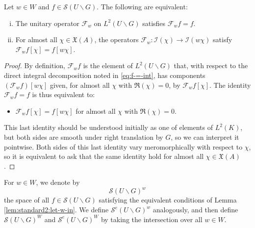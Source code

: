 \begin{lemma}\label{lem:standard2:let-w-in}
  Let $w \in W$ and $f \in \mathcal{S}(U \backslash G)$.  The following are equivalent:
  \begin{enumerate}[(i)]
  \item \label{itm:standard2:F-w-unitary} The unitary operator $\mathcal{F}_w$ on $L^2(U \backslash G)$ satisfies $\mathcal{F}_w f = f$.
  \item \label{itm:standard2:F-w-mellin} For almost all $\chi \in \mathfrak{X}(A)$, the operators $\mathcal{F}_w : \mathcal{I}(\chi) \rightarrow \mathcal{I}(w \chi)$ satisfy $\mathcal{F}_w f[\chi] = f [ w \chi]$.
  \end{enumerate}
\end{lemma}
\begin{proof}
  By definition, $\mathcal{F}_w f$ is the element of $L^2(U \backslash G)$ that, with respect to the direct integral decomposition noted in \eqref{eq:f-=-int}, has components $(\mathcal{F}_w f)[w \chi]$ given, for almost all $\chi$ with $\Re(\chi) = 0$, by $\mathcal{F}_w f[\chi]$.  The identity $\mathcal{F}_w f = f$ is thus equivalent to:
  \begin{itemize}
  \item $\mathcal{F}_w f[\chi] = f[w \chi]$ for almost all $\chi$ with $\Re(\chi) = 0$.
  \end{itemize}
  This last identity should be understood initially as one of elements of $L^2(K)$, but both sides are smooth under right translation by $G$, so we can interpret it pointwise.  Both sides of this last identity vary meromorphically with respect to $\chi$, so it is equivalent to ask that the same identity hold for almost all $\chi \in \mathfrak{X}(A)$.
\end{proof}

For $w \in W$, we denote by 
\begin{equation}\label{eq:mathc-backsl-gw}
  \mathcal{S}(U \backslash G)^w
\end{equation}
the space of all $f \in \mathcal{S}(U \backslash G)$ satisfying the equivalent conditions of Lemma \ref{lem:standard2:let-w-in}.  We define $\mathcal{S}^e(U \backslash G)^w$ analogously, and then define $\mathcal{S}(U \backslash G)^W$ and $\mathcal{S}^e(U \backslash G)^W$ by taking the intersection over all $w \in W$.  

